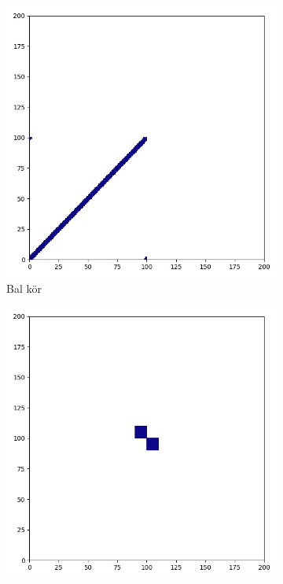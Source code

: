 \begin{figure}[H]
  \centering
  \begin{subfigure}{.3\linewidth}
    \centering
    \includegraphics[width=\linewidth]{./figures/sulyzo/subgraph_00.jpg}
    \caption{Bal kör}
    \label{fig:sub1}
  \end{subfigure}
  \begin{subfigure}{.3\linewidth}
    \centering
    \includegraphics[width=\linewidth]{./figures/sulyzo/subgraph_02.jpg}

\end{subfigure}
\end{figure}
